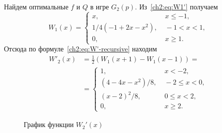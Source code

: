 {\begin{example}
  Найдем оптимальные $f$ и $Q$ в игре $G_2(p)$.
  Из~\eqref{ch2:eq:W1'} получаем
  \begin{equation*}
    W_1(x) = \begin{cases}
      x, &\; x \leqslant -1,\\
      1/4 (-1 + 2x - x^2), &\; -1 < x < 1,\\
      0, &\; x \geqslant 1.
    \end{cases}
  \end{equation*}
  Отсюда по формуле~\eqref{ch2:eq:W'-recursive} находим
  \begin{align*}
    W'_2(x) 
    &= \frac{1}{2} \left( W_1(x+1) - W_1(x-1) \right) =\\
    &= \begin{cases}
      1, &\; x < -2,\\
      (4 - 4x - x^2)/8, &\; -2 \leqslant x < 0,\\
      (x - 2)^2/8, &\; 0 \leqslant x < 2,\\
      0, &\; x \geqslant 2.
    \end{cases}
  \end{align*}

  \begin{figure}[hbt]
    \centering 
    \caption{График функции $W_2'(x)$}
    \label{ch2:fig:W2}
  \end{figure}


\end{example}}
